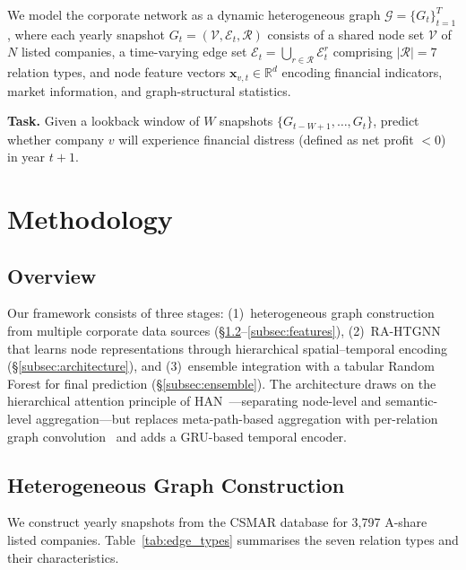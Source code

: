 \documentclass[3p,times,procedia]{elsarticle}
\begin{document}
We model the corporate network as a dynamic heterogeneous graph $\mathcal{G} = \{G_t\}_{t=1}^{T}$, where each yearly snapshot $G_t = (\mathcal{V}, \mathcal{E}_t, \mathcal{R})$ consists of a shared node set $\mathcal{V}$ of $N$ listed companies, a time-varying edge set $\mathcal{E}_t = \bigcup_{r \in \mathcal{R}} \mathcal{E}_t^r$ comprising $|\mathcal{R}|=7$ relation types, and node feature vectors $\mathbf{x}_{v,t} \in \mathbb{R}^d$ encoding financial indicators, market information, and graph-structural statistics.

\textbf{Task.} Given a lookback window of $W$ snapshots $\{G_{t-W+1}, \ldots, G_t\}$, predict whether company $v$ will experience financial distress (defined as net profit $< 0$) in year $t+1$.


\section{Methodology}
\label{sec:method}

\subsection{Overview}
\label{subsec:overview}

Our framework consists of three stages: (1)~heterogeneous graph construction from multiple corporate data sources (\S\ref{subsec:graph_construction}--\ref{subsec:features}), (2)~RA-HTGNN that learns node representations through hierarchical spatial--temporal encoding (\S\ref{subsec:architecture}), and (3)~ensemble integration with a tabular Random Forest for final prediction (\S\ref{subsec:ensemble}).
The architecture draws on the hierarchical attention principle of HAN~\cite{wang2019heterogeneous}---separating node-level and semantic-level aggregation---but replaces meta-path-based aggregation with per-relation graph convolution~\cite{schlichtkrull2018modeling} and adds a GRU-based temporal encoder.

\subsection{Heterogeneous Graph Construction}
\label{subsec:graph_construction}

We construct yearly snapshots from the CSMAR database for 3{,}797 A-share listed companies.
Table~\ref{tab:edge_types} summarises the seven relation types and their characteristics.
\end{document}
